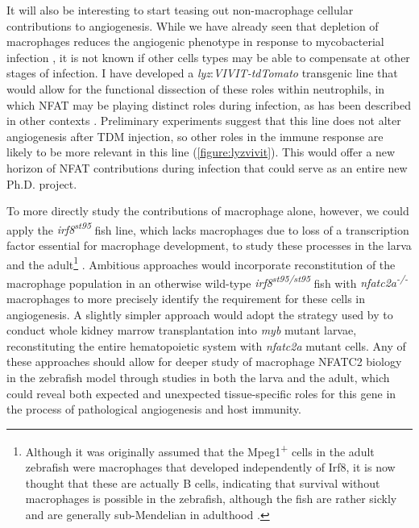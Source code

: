 It will also be interesting to start teasing out non\hyp{}macrophage cellular contributions to angiogenesis. While we have already seen that depletion of macrophages reduces the angiogenic phenotype in response to mycobacterial infection \citep{Oehlers2015}, it is not known if other cells types may be able to compensate at other stages of infection. I have developed a \textit{lyz}:\textit{VIVIT\hyp{}tdTomato} transgenic line that would allow for the functional dissection of these roles within neutrophils, in which NFAT may be playing distinct roles during infection, as has been described in other contexts \citep{Herbst2015, Vymazal2021, Vega2007}. Preliminary experiments suggest that this line does not alter angiogenesis after TDM injection, so other roles in the immune response are likely to be more relevant in this line (\autoref{figure:lyzvivit}). This would offer a new horizon of NFAT contributions during infection that could serve as an entire new Ph.D. project.

To more directly study the contributions of macrophage alone, however, we could apply the \textit{irf8\textsuperscript{st95}} fish line, which lacks macrophages due to loss of a transcription factor essential for macrophage development, to study these processes in the larva and the adult\footnote{Although it was originally assumed that the Mpeg1\textsuperscript{+} cells in the adult zebrafish were macrophages that developed independently of Irf8, it is now thought that these are actually B cells, indicating that survival without macrophages is possible in the zebrafish, although the fish are rather sickly and are generally sub-Mendelian in adulthood \citep{Ferrero2020}.} \citep{Shiau2015, Xu2012, Tamura2005}. Ambitious approaches would incorporate reconstitution of the macrophage population in an otherwise wild\hyp{}type \textit{irf8\textsuperscript{st95/st95}} fish with \textit{nfatc2a\textsuperscript{\hyp{}/\hyp{}}} macrophages to more precisely identify the requirement for these cells in angiogenesis. A slightly simpler approach would adopt the strategy used by \citet{Cronan2021} to conduct whole kidney marrow transplantation into \textit{myb} mutant larvae, reconstituting the entire hematopoietic system with \textit{nfatc2a} mutant cells. Any of these approaches should allow for deeper study of macrophage NFATC2 biology in the zebrafish model through studies in both the larva and the adult, which could reveal both expected and unexpected tissue-specific roles for this gene in the process of pathological angiogenesis and host immunity.

